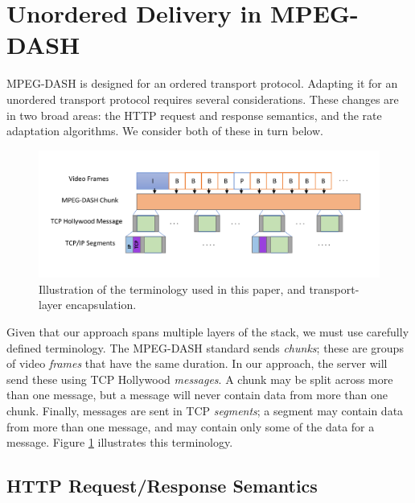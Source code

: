 \section{Unordered Delivery in MPEG-DASH}
\label{sec:transport}

MPEG-DASH is designed for an ordered transport protocol. Adapting it for an
unordered transport protocol requires several considerations. These
changes are in two broad areas: the HTTP request and response semantics, and the rate
adaptation algorithms. We consider both of these in turn below.

\begin{figure}
  \centering
  \includegraphics[width=\columnwidth]{figures/terminology2.pdf}
  \caption{Illustration of the terminology used in this paper, and transport-layer encapsulation.}
  \label{fig:terminology}
\end{figure}

Given that our approach spans multiple layers of the stack, we must use carefully defined
terminology. The MPEG-DASH standard sends \emph{chunks}; these are groups of video
\emph{frames} that have the same duration. In our approach, the server will send these
using TCP Hollywood \emph{messages}. A chunk may be split across more than one message,
but a message will never contain data from more than one chunk. Finally, messages are
sent in TCP \emph{segments}; a segment may contain data from more than one message, and
may contain only some of the data for a message.
Figure \ref{fig:terminology} illustrates this terminology.

\subsection{HTTP Request/Response Semantics}

